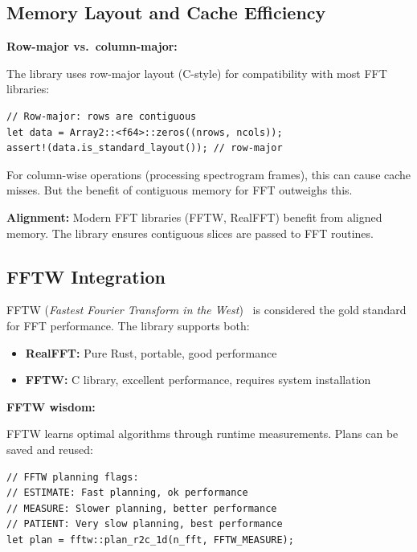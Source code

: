 \subsection{Memory Layout and Cache Efficiency}

\textbf{Row-major vs.\ column-major:}

The library uses row-major layout (C-style) for compatibility with
most FFT libraries:

\begin{lstlisting}[caption={Asserting row-major layout for FFT compatibility}]
// Row-major: rows are contiguous
let data = Array2::<f64>::zeros((nrows, ncols));
assert!(data.is_standard_layout()); // row-major
\end{lstlisting}

For column-wise operations (processing spectrogram frames), this can
cause cache misses. But the benefit of contiguous memory for FFT outweighs this.

\textbf{Alignment:} Modern FFT libraries (FFTW, RealFFT) benefit from
aligned memory. The library ensures contiguous slices are passed to
FFT routines.

\subsection{FFTW Integration}\label{subsec:fftw}

FFTW (\emph{Fastest Fourier Transform in the
West})~\cite{frigo2005design} is considered the gold standard for FFT
performance. The library supports both:

\begin{itemize}
  \item \textbf{RealFFT:} Pure Rust, portable, good performance
  \item \textbf{FFTW:} C library, excellent performance, requires
    system installation
\end{itemize}

\textbf{FFTW wisdom:}

FFTW learns optimal algorithms through runtime measurements. Plans
can be saved and reused:

\begin{lstlisting}[caption={FFTW planning modes from ESTIMATE to PATIENT}]
// FFTW planning flags:
// ESTIMATE: Fast planning, ok performance
// MEASURE: Slower planning, better performance
// PATIENT: Very slow planning, best performance
let plan = fftw::plan_r2c_1d(n_fft, FFTW_MEASURE);
\end{lstlisting}


